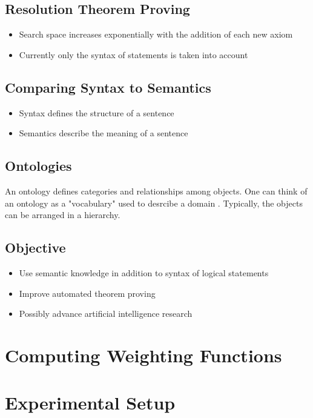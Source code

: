 \documentclass{article}
\begin{document}
	\subsection{Resolution Theorem Proving}
        \begin{itemize}
            \item Search space increases exponentially with the addition of each new axiom
            \item Currently only the syntax of statements is taken into account
        \end{itemize}
	
	\subsection{Comparing Syntax to Semantics}
		\begin{itemize}
		    \item Syntax defines the structure of a sentence
		    \item Semantics describe the meaning of a sentence
		\end{itemize}
	
	\subsection{Ontologies}
		An ontology defines categories and relationships among objects.
		One can think of an ontology as a "vocabulary" used to desrcibe a domain \cite[308]{russell2016artificial}. Typically, the objects can be arranged in a hierarchy. 

	
	\subsection{Objective}
		\begin{itemize}
		    \item Use semantic knowledge in addition to syntax of logical statements
		    \item Improve automated theorem proving
		    \item Possibly advance artificial intelligence research
		\end{itemize}
	
\section{Computing Weighting Functions}

\section{Experimental Setup}
\end{document}
